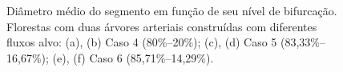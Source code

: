\begin{figure}[!htb]
  \centering
  \captiondelim{: }
  \caption{Diâmetro médio do segmento em função de seu nível de bifurcação. 
  Florestas com duas árvores arteriais construídas com diferentes fluxos alvo: 
  (a), (b) Caso 4 (80\%--20\%); (c), (d) Caso 5 (83,33\%--16,67\%);  (e), (f) Caso 6 (85,71\%--14,29\%).}
  
  \hspace{12pt}


\end{figure}
